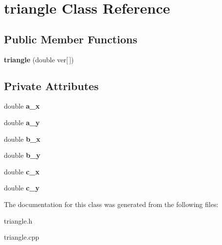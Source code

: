 \hypertarget{classtriangle}{}\section{triangle Class Reference}
\label{classtriangle}
\subsection*{Public Member Functions}
\begin{DoxyCompactItemize}
\item 
\mbox{\label{classtriangle_aab2adac15175072954ef95e719e2b8d9}} 
{\bfseries triangle} (double ver\mbox{[}$\,$\mbox{]})
\end{DoxyCompactItemize}
\subsection*{Private Attributes}
\begin{DoxyCompactItemize}
\item 
\mbox{\label{classtriangle_a3a4cdb2ef864242bfb9ff44e4e419ecc}} 
double {\bfseries a\+\_\+x}
\item 
\mbox{\label{classtriangle_aab8f297c5a13b4200cf617062c8fa8ad}} 
double {\bfseries a\+\_\+y}
\item 
\mbox{\label{classtriangle_a635be43d6df90d986a7a87c63411a955}} 
double {\bfseries b\+\_\+x}
\item 
\mbox{\label{classtriangle_a5ea3b68f882a55d75a0a9874a368edda}} 
double {\bfseries b\+\_\+y}
\item 
\mbox{\label{classtriangle_a9e13815109842d7daa44e7f6523cab69}} 
double {\bfseries c\+\_\+x}
\item 
\mbox{\label{classtriangle_adee75fa1b901032f52b5b2980d93bae6}} 
double {\bfseries c\+\_\+y}
\end{DoxyCompactItemize}


The documentation for this class was generated from the following files\+:\begin{DoxyCompactItemize}
\item 
triangle.\+h\item 
triangle.\+cpp\end{DoxyCompactItemize}

